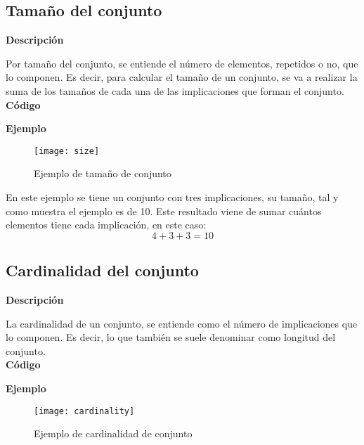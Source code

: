 \subsection{Tama\~no del conjunto}

    \textbf{Descripci\'on}

    Por tama\~no del conjunto, se entiende el n\'umero de elementos, repetidos o no, que lo componen. 
    Es decir, para calcular el tama\~no de un conjunto, se va a realizar la suma de los tama\~nos de cada una de 
    las implicaciones que forman el conjunto.
    \\


    \textbf{C\'odigo}

    
    \bigskip

    \textbf{Ejemplo}

    \begin{figure}[H]
        \centering
        \texttt{[image: size]}
        \caption{Ejemplo de tama\~no de conjunto}
        \label{fig:size}
    \end{figure}

    En este ejemplo se tiene un conjunto con tres implicaciones, su tama\~no, tal y como muestra el ejemplo es de 10. 
    Este resultado viene de sumar cu\'antos elementos tiene cada implicaci\'on, en este caso:
    \[
        4 + 3 + 3 = 10    
    \]



\subsection{Cardinalidad del conjunto}

    \textbf{Descripci\'on}

    La cardinalidad de un conjunto, se entiende como el n\'umero de implicaciones que lo componen. Es decir, lo que 
    tambi\'en se suele denominar como longitud del conjunto.
    \\


    \textbf{C\'odigo}

    
    \bigskip

    \clearpage
    \textbf{Ejemplo}


    \begin{figure}[H]
        \centering
        \texttt{[image: cardinality]}
        \caption{Ejemplo de cardinalidad de conjunto}
        \label{fig:cardinality}
    \end{figure}

